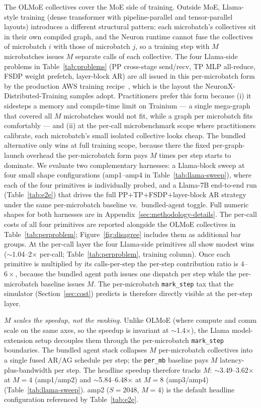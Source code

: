 The OLMoE collectives cover the MoE side of training. Outside
MoE, Llama-style training (dense transformer with
pipeline-parallel and tensor-parallel layouts) introduces a
different structural pattern: each microbatch's collectives sit
in their own compiled graph, and the Neuron runtime cannot fuse
the collectives of microbatch $i$ with those of microbatch $j$,
so a training step with $M$ microbatches issues $M$ separate
calls of each collective. The four Llama-side problems
in Table~\ref{tab:problems} (PP cross-stage send/recv, TP MLP
all-reduce, FSDP weight prefetch, layer-block AR) are all
issued in this per-microbatch form by the production AWS
training recipe~\cite{aws_neuron_tutorials,
aws_neuron_distributed_tutorials}, which is the layout the
NeuronX-Distributed-Training samples adopt. Practitioners
prefer this form because (i) it sidesteps a memory and
compile-time limit on Trainium --- a single mega-graph
that covered all $M$ microbatches would not fit, while a
graph per microbatch fits comfortably --- and (ii) at the
per-call microbenchmark scope where practitioners calibrate,
each microbatch's small isolated collective looks cheap. The
bundled alternative only wins at full training scope,
because there the fixed per-graph-launch overhead the
per-microbatch form pays $M$ times per step starts to dominate.
We evaluate two complementary harnesses: a Llama-block sweep
at four small shape configurations (amp1--amp4 in
Table~\ref{tab:llama-sweep}), where each of the four primitives
is individually probed, and a Llama-7B end-to-end run
(Table~\ref{tab:e2e}) that drives the full
PP$+$TP$+$FSDP$+$layer-block AR strategy under the same
per-microbatch baseline vs.\ bundled-agent toggle. Full
numeric shapes for both harnesses are in
Appendix~\ref{sec:methodology-details}.
The per-call costs of all four primitives are reported alongside
the OLMoE collectives in Table~\ref{tab:perproblem};
Figure~\ref{fig:disagree} includes them as additional bar groups.
At the per-call layer the four Llama-side primitives all show
modest wins ($\sim$1.04--2$\times$ per-call;
Table~\ref{tab:perproblem}, training column). Once each primitive
is multiplied by its calls-per-step the per-step contribution
ratio is $4$--$6\times$, because the bundled agent path issues one
dispatch per step while the per-microbatch baseline issues $M$.
The per-microbatch \texttt{mark\_step} tax that the simulator
(Section~\ref{sec:cost}) predicts is therefore directly visible at
the per-step layer.

\emph{$M$ scales the speedup, not the ranking.} Unlike OLMoE
(where compute and comm scale on the same axes, so the speedup is
invariant at $\sim$1.4$\times$), the Llama model-extension setup
decouples them through the per-microbatch \texttt{mark\_step}
boundaries. The bundled agent stack collapses $M$ per-microbatch
collectives into a single fused AR$/$AG schedule per step;
the \texttt{per\_mb} baseline pays $M$ latency-plus-bandwidth per
step. The headline speedup therefore tracks $M$:
$\sim$3.49--3.62$\times$ at $M{=}4$ (amp1/amp2) and
$\sim$5.84--6.48$\times$ at $M{=}8$ (amp3/amp4)
(Table~\ref{tab:llama-sweep}). amp2 ($S{=}2048$, $M{=}4$) is the
default headline configuration referenced by
Table~\ref{tab:e2e}.

